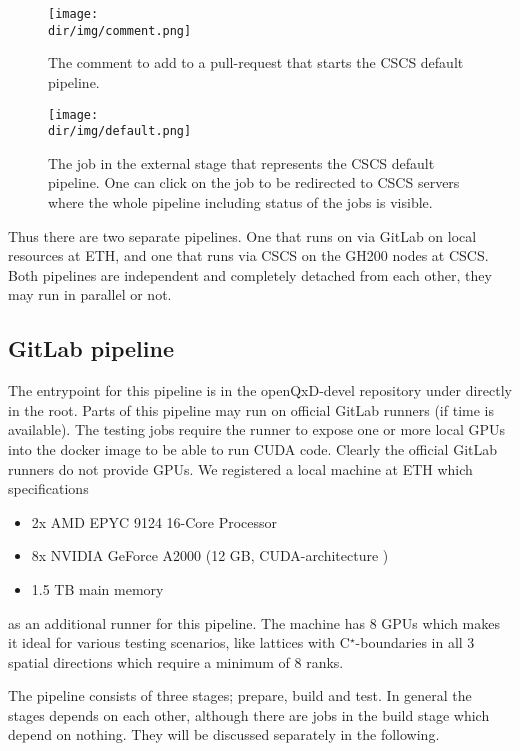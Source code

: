 \begin{figure}
    \centering
    \texttt{[image: \\dir/img/comment.png]}
    \caption{The comment to add to a pull-request that starts the CSCS default pipeline.}
    \label{fig:cicd:comment}
\end{figure}

\begin{figure}
    \centering
    \texttt{[image: \\dir/img/default.png]}
    \caption{The job in the external stage that represents the CSCS default pipeline. One can click on the job to be redirected to CSCS servers where the whole pipeline including status of the jobs is visible.}
    \label{fig:cicd:external}
\end{figure}

Thus there are two separate pipelines. One that runs on via GitLab on local resources at ETH, and one that runs via CSCS on the GH200 nodes at CSCS. Both pipelines are independent and completely detached from each other, they may run in parallel or not.

\subsection{GitLab pipeline}
\label{sec:cicd:pipeline:gitlab}

The entrypoint for this pipeline is in the openQxD-devel repository\cite{gitlab:openqxd-devel} under  directly in the root. Parts of this pipeline may run on official GitLab runners (if time is available). The testing jobs require the runner to expose one or more local GPUs into the docker image to be able to run CUDA code. Clearly the official GitLab runners do not provide GPUs. We registered a local machine at ETH which specifications
\begin{itemize}
    \item 2x AMD EPYC 9124 16-Core Processor
    \item 8x NVIDIA GeForce A2000 (12 GB, CUDA-architecture )
    \item 1.5 TB main memory
\end{itemize}
as an additional runner for this pipeline. The machine has 8 GPUs which makes it ideal for various testing scenarios, like lattices with C$^\star$-boundaries in all $3$ spatial directions which require a minimum of 8 ranks.

The pipeline consists of three stages; prepare, build and test. In general the stages depends on each other, although there are jobs in the build stage which depend on nothing. They will be discussed separately in the following.

